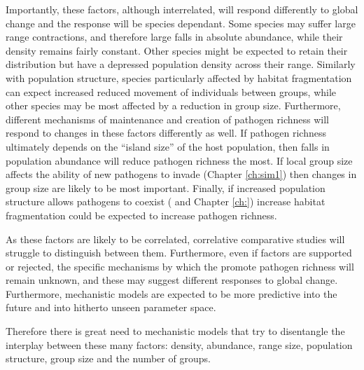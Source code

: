 Importantly, these factors, although interrelated, will respond differently to global change and the response will be species dependant.
Some species may suffer large range contractions, and therefore large falls in absolute abundance, while their density remains fairly constant.
Other species might be expected to retain their distribution but have a depressed population density across their range.
Similarly with population structure, species particularly affected by habitat fragmentation can expect increased reduced movement of individuals between groups, while other species may be most affected by a reduction in group size.
Furthermore, different mechanisms of maintenance and creation of pathogen richness will respond to changes in these factors differently as well.
If pathogen richness ultimately depends on the ``island size'' of the host population, then falls in population abundance will reduce pathogen richness the most.
If local group size affects the ability of new pathogens to invade (Chapter \ref{ch:sim1}) then changes in group size are likely to be most important.
Finally, if increased population structure allows pathogens to coexist (\parencite{qiu2013vector, allen2004sis, nunes2006localized} and Chapter \ref{ch:}) increase habitat fragmentation could be expected to increase pathogen richness.

As these factors are likely to be correlated, correlative comparative studies will struggle to distinguish between them.
Furthermore, even if factors are supported or rejected, the specific mechanisms by which the promote pathogen richness will remain unknown, and these may suggest different responses to global change.
Furthermore, mechanistic models are expected to be more predictive into the future and into hitherto unseen parameter space.





Therefore there is great need to mechanistic models that try to disentangle the interplay between these many factors: density, abundance, range size, population structure, group size and the number of groups.











